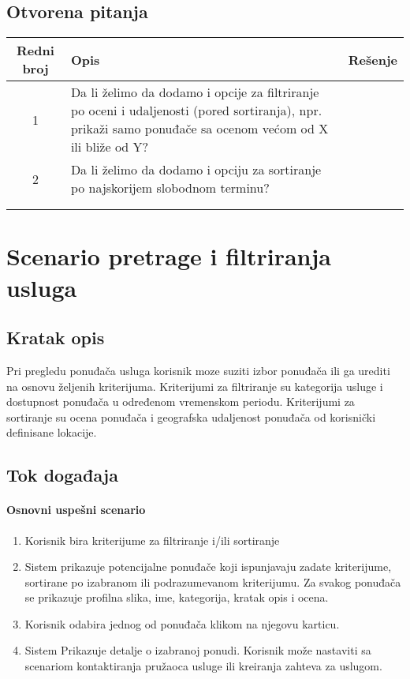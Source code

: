 \documentclass[a4paper,12pt]{report}
\newcommand{\genitivfunkcionalnosti}{pretrage i filtriranja usluga}
\begin{document}
		\subsection{Otvorena pitanja}
			\begin{tabular}{ |c|p{10cm}|l| }
				\hline
				\textbf{Redni broj} & \textbf{Opis} & \textbf{Rešenje} \\ 
				\hline
			    1 & Da li želimo da dodamo i opcije za filtriranje po oceni i udaljenosti (pored sortiranja), npr. prikaži samo ponuđače sa ocenom većom od X ili bliže od Y? &  \\
				\hline
			    2 & Da li želimo da dodamo i opciju za sortiranje po najskorijem slobodnom terminu?  & \\
				\hline
				&  & \\
				\hline
				&  & \\
				\hline
			\end{tabular}
	\section{Scenario \genitivfunkcionalnosti}
		\subsection{Kratak opis}
			Pri pregledu ponuđača usluga korisnik moze suziti izbor ponuđača ili ga urediti na osnovu željenih kriterijuma.
			Kriterijumi za filtriranje su kategorija usluge i dostupnost ponuđača u određenom vremenskom periodu.
			Kriterijumi za sortiranje su ocena ponuđača i geografska udaljenost ponuđača od korisnički definisane lokacije.
		\newpage
		\subsection{Tok događaja}
			\paragraph*{Osnovni uspešni scenario}
				\begin{enumerate}
					\item Korisnik bira kriterijume za filtriranje i/ili sortiranje
					\item Sistem prikazuje potencijalne ponuđače koji ispunjavaju zadate kriterijume, sortirane po izabranom ili podrazumevanom kriterijumu. Za svakog ponuđača se prikazuje profilna slika, ime, kategorija, kratak opis i ocena.
					\item Korisnik odabira jednog od ponuđača klikom na njegovu karticu.
					\item Sistem Prikazuje detalje o izabranoj ponudi. Korisnik može nastaviti sa scenariom kontaktiranja pružaoca usluge ili kreiranja zahteva za uslugom.
				\end{enumerate}
\end{document}
